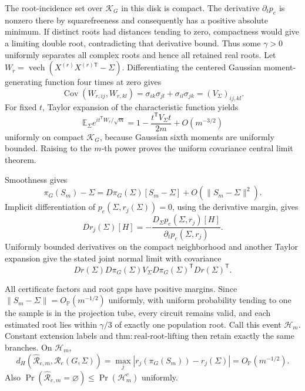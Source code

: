 The root-incidence set over \(\mathcal K_G\) in this disk is compact. The derivative \(\partial_t p_e\) is nonzero there by squarefreeness and consequently has a positive absolute minimum. If distinct roots had distances tending to zero, compactness would give a limiting double root, contradicting that derivative bound. Thus some \(\gamma>0\) uniformly separates all complex roots and hence all retained real roots.
Let \(W_r=\operatorname{vech}(X^{(r)}X^{(r)\mathsf T}-\Sigma)\). Differentiating the centered Gaussian moment-generating function four times at zero gives
\[
\operatorname{Cov}(W_{r,ij},W_{r,kl})
=\sigma_{ik}\sigma_{jl}+\sigma_{il}\sigma_{jk}=(V_\Sigma)_{ij,kl}.
\]
For fixed \(t\), Taylor expansion of the characteristic function yields
\[
\mathbb E_\Sigma e^{it^{\mathsf T}W_r/\sqrt m}
=1-\frac{t^{\mathsf T}V_\Sigma t}{2m}+O(m^{-3/2})
\]
uniformly on compact \(\mathcal K_G\), because Gaussian sixth moments are uniformly bounded. Raising to the \(m\)-th power proves the uniform covariance central limit theorem.

Smoothness gives
\[
\pi_G(S_m)-\Sigma=D\pi_G(\Sigma)[S_m-\Sigma]+O(\|S_m-\Sigma\|^2).
\]
Implicit differentiation of \(p_e(\Sigma,r_j(\Sigma))=0\), using the derivative margin, gives
\[
Dr_j(\Sigma)[H]=-\frac{D_\Sigma p_e(\Sigma,r_j)[H]}{\partial_t p_e(\Sigma,r_j)}.
\]
Uniformly bounded derivatives on the compact neighborhood and another Taylor expansion give the stated joint normal limit with covariance
\[
Dr(\Sigma)D\pi_G(\Sigma)V_\Sigma D\pi_G(\Sigma)^{\mathsf T}Dr(\Sigma)^{\mathsf T}.
\]

All certificate factors and root gaps have positive margins. Since \(\|S_m-\Sigma\|=O_{\mathbb P}(m^{-1/2})\) uniformly, with uniform probability tending to one the sample is in the projection tube, every circuit remains valid, and each estimated root lies within \(\gamma/3\) of exactly one population root. Call this event \(\mathcal H_m\). Constant extension labels and \(\mathrm{thm:real\mbox{-}root\mbox{-}lifting}\) then retain exactly the same branches. On \(\mathcal H_m\),
\[
d_H(\widehat{\mathcal R}_{e,m},\mathcal R_e(G,\Sigma))
=\max_j|r_j(\pi_G(S_m))-r_j(\Sigma)|=O_{\mathbb P}(m^{-1/2}).
\]
Also \(\Pr(\widehat{\mathcal R}_{e,m}=\varnothing)\le\Pr(\mathcal H_m^c)\) uniformly.

